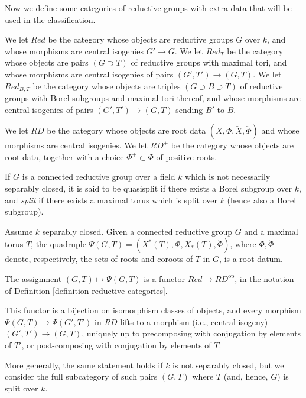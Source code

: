 Now we define some categories of reductive groups with extra data that will be used in the classification.

\begin{definition}
 \label{definition-reductive-categories}
We let $Red$ be the category whose objects are reductive groups $G$ over $k$, and whose morphisms are central isogenies $G'\to G$. We let $Red_T$ be the category whose objects are pairs $(G\supset T)$ of reductive groups with maximal tori, and whose morphisms are central isogenies of pairs $(G',T')\to (G,T)$. We let $Red_{B,T}$ be the category whose objects are triples $(G\supset B\supset T)$ of reductive groups with Borel subgroups and maximal tori thereof, and whose morphisms are central isogenies of pairs $(G',T')\to (G,T)$ sending $B'$ to $B$.

We let $RD$ be the category whose objects are root data $(X,\Phi, \check X,\check\Phi)$ and whose morphisms are central isogenies. We let $RD^+$ be the category whose objects are root data, together with a choice $\Phi^+\subset \Phi$ of positive roots.
\end{definition}

\begin{definition}
\label{definition-split-nonsplit}
 If $G$ is a connected reductive group over a field $k$ which is not necessarily separably closed, it is said to be {quasisplit} if there exists a Borel subgroup over $k$, and {\it split} if there exists a maximal torus which is split over $k$ (hence also a Borel subgroup). 
\end{definition}



\begin{theorem}
\label{theorem-classification-reductive}
 Assume $k$ separably closed. Given a connected reductive group $G$ and a maximal torus $T$, the quadruple $\Psi(G,T)=(X^*(T), \Phi, X_*(T), \check\Phi)$, where $\Phi,\check\Phi$ denote, respectively, the sets of roots and coroots of $T$ in $G$, is a root datum.
 
 The assignment $(G,T)\mapsto \Psi(G,T)$ is a functor $Red \to RD^{\text{op}}$, in the notation of Definition \ref{definition-reductive-categories}.
 
 This functor is a bijection on isomorphism classes of objects, and every morphism $\Psi(G,T)\to \Psi(G',T')$ in $RD$ lifts to a morphism (i.e., central isogeny) $(G',T')\to (G,T)$, uniquely up to precomposing with conjugation by elements of $T'$, or post-composing with conjugation by elements of $T$.
 
 More generally, the same statement holds if $k$ is not separably closed, but we consider the full subcategory of such pairs $(G,T)$ where $T$ (and, hence, $G$) is split over $k$.
\end{theorem}

